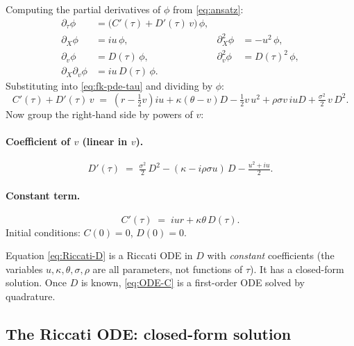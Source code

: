 \documentclass[11pt]{article}
\theoremstyle{plain}
\theoremstyle{definition}
\theoremstyle{remark}
\begin{document}
Computing the partial derivatives of \(\phi\) from \eqref{eq:ansatz}:
\[
    \begin{aligned}
        \partial_\tau \phi &= \bigl(C'(\tau) + D'(\tau)\, v\bigr)\, \phi, \\
        \partial_X \phi &= i u\, \phi,                          & \partial^2_X \phi &= -u^2\, \phi, \\
        \partial_v \phi &= D(\tau)\, \phi,                      & \partial^2_v \phi &= D(\tau)^2\, \phi, \\
        \partial_X \partial_v \phi &= i u\, D(\tau)\, \phi.     &  &
    \end{aligned}
\]
Substituting into \eqref{eq:fk-pde-tau} and dividing by \(\phi\):
\[
    C'(\tau) + D'(\tau)\, v \;=\; \left(r - \tfrac12 v\right) i u + \kappa(\theta - v) D - \tfrac12 v\, u^2 + \rho\sigma v\, i u D + \tfrac{\sigma^2}{2}\, v\, D^2.
\]
Now group the right-hand side by powers of \(v\):

\paragraph{Coefficient of \(v\) (linear in \(v\)).}
\begin{equation}
    D'(\tau) \;=\; \tfrac{\sigma^2}{2}\, D^2 - (\kappa - i \rho \sigma u)\, D - \tfrac{u^2 + i u}{2}.            \label{eq:Riccati-D}
\end{equation}

\paragraph{Constant term.}
\begin{equation}
    C'(\tau) \;=\; i u r + \kappa\theta\, D(\tau).                                                              \label{eq:ODE-C}
\end{equation}
Initial conditions: \(C(0) = 0\), \(D(0) = 0\).

Equation \eqref{eq:Riccati-D} is a Riccati ODE in \(D\) with \emph{constant} coefficients (the variables \(u, \kappa, \theta, \sigma, \rho\) are all parameters, not functions of \(\tau\)). It has a closed-form solution. Once \(D\) is known, \eqref{eq:ODE-C} is a first-order ODE solved by quadrature.

\subsection{The Riccati ODE: closed-form solution}
\end{document}
